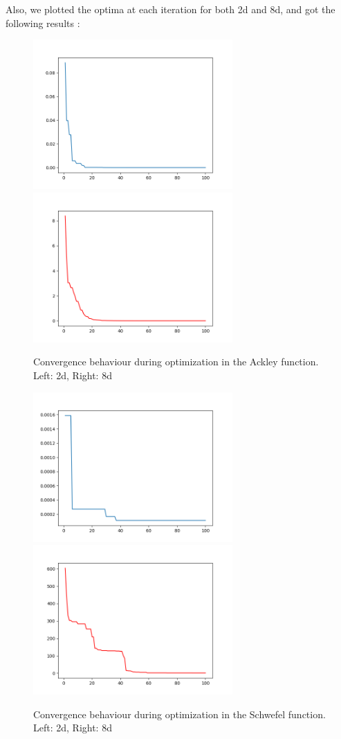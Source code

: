 \documentclass[journal,onecolumn]{IEEEtran}
\begin{document}
Also, we plotted the optima at each iteration for both 2d and 8d, and got the following results :

\begin{figure}[H]
\centering
\captionsetup{justification=centering}
\includegraphics[width=3.0in]{_img/img_PSO_convergence_ackley_2d.png}
\includegraphics[width=3.0in]{_img/img_PSO_convergence_ackley_8d.png}
\caption{Convergence behaviour during optimization in the Ackley function. Left: 2d, Right: 8d}
\end{figure}

\begin{figure}[H]
\centering
\captionsetup{justification=centering}
\includegraphics[width=3.0in]{_img/img_PSO_convergence_schwefel_2d.png}
\includegraphics[width=3.0in]{_img/img_PSO_convergence_schwefel_8d.png}
\caption{Convergence behaviour during optimization in the Schwefel function. Left: 2d, Right: 8d}
\end{figure}
\end{document}

